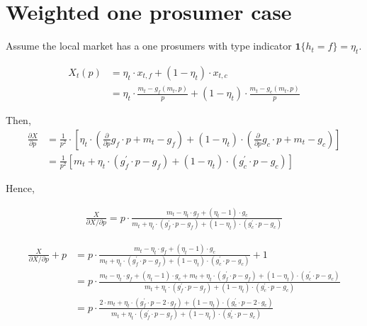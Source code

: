 \documentclass[american]{scrartcl}
\begin{document}

\iffalse %

	\section{Weighted one prosumer case}

	Assume the local market has a one prosumers with type indicator $\mathbf{1}\{h_t = f\} = \eta_t$.

	\begin{equation}
		\begin{split}
			X_t(p) &= \eta_t \cdot x_{t, f} + (1 - \eta_t) \cdot x_{t, c} \\
			&= \eta_t \cdot \frac{m_t - g_f(m_t, p)}{p} + (1 - \eta_t) \cdot \frac{m_t - g_c(m_t, p)}{p}
		\end{split}
	\end{equation}


	Then,
	\begin{equation}
		\begin{split}
			\frac{\partial X}{\partial p} &= \frac{1}{p^2} \cdot \left[ \eta_t \cdot \left(\frac{\partial}{\partial p} g_f \cdot p + m_t - g_f \right) + (1 - \eta_t) \cdot \left(\frac{\partial}{\partial p} g_c \cdot p + m_t - g_c \right) \right] \\
			&=\frac{1}{p^2} \left[m_t + \eta_t \cdot \left( g^\prime_f \cdot p - g_f \right) + (1 - \eta_t) \cdot \left( g^\prime_c \cdot p - g_c \right) \right]
		\end{split}
	\end{equation}

	Hence,

	\begin{equation}
		\begin{split}
			\frac{X}{\partial X / \partial p} = p \cdot \frac{m_t - \eta_t \cdot g_f + (\eta_t - 1) \cdot g_c}{m_t + \eta_t \cdot ( g^\prime_f \cdot p - g_f ) + (1 - \eta_t) \cdot (g^\prime_c \cdot p - g_c)}
		\end{split}
	\end{equation}

	\begin{equation}
		\begin{split}
			\frac{X}{\partial X / \partial p} + p &= p \cdot \frac{m_t - \eta_t \cdot g_f + (\eta_t - 1) \cdot g_c}{m_t + \eta_t \cdot ( g^\prime_f \cdot p - g_f ) + (1 - \eta_t) \cdot (g^\prime_c \cdot p - g_c)} + 1 \\
			&= p \cdot  \frac{m_t - \eta_t \cdot g_f + (\eta_t - 1) \cdot g_c + m_t + \eta_t \cdot ( g^\prime_f \cdot p - g_f ) + (1 - \eta_t) \cdot (g^\prime_c \cdot p - g_c)}{m_t + \eta_t \cdot ( g^\prime_f \cdot p - g_f ) + (1 - \eta_t) \cdot (g^\prime_c \cdot p - g_c)} \\
			&= p \cdot \frac{2 \cdot m_t + \eta_t \cdot (g^\prime_f \cdot p - 2\cdot g_f) + (1 - \eta_t) \cdot (g^\prime_c \cdot p - 2\cdot g_c)}{m_t + \eta_t \cdot ( g^\prime_f \cdot p - g_f ) + (1 - \eta_t) \cdot (g^\prime_c \cdot p - g_c)}
		\end{split}
	\end{equation}
\end{document}

